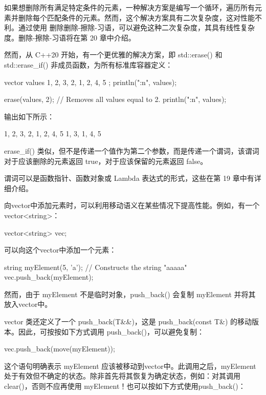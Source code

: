如果想删除所有满足特定条件的元素，一种解决方案是编写一个循环，遍历所有元素并删除每个匹配条件的元素。然而，这个解决方案具有二次复杂度，这对性能不利。通过使用 删除删除-擦除-习语，可以避免这种二次复杂度，其具有线性复杂度。删除-擦除-习语将在第 20 章中介绍。

然而，从 C++20 开始，有一个更优雅的解决方案，即 std::erase() 和 std::erase\_if() 非成员函数，为所有标准库容器定义：

\begin{cpp}
vector values { 1, 2, 3, 2, 1, 2, 4, 5 };
println("{:n}", values);

erase(values, 2); // Removes all values equal to 2.
println("{:n}", values);
\end{cpp}

输出如下所示：

\begin{shell}
1, 2, 3, 2, 1, 2, 4, 5
1, 3, 1, 4, 5
\end{shell}

erase\_if() 类似，但不是传递一个值作为第二个参数，而是传递一个谓词，该谓词对于应该删除的元素返回 true，对于应该保留的元素返回 false。

谓词可以是函数指针、函数对象或 Lambda 表达式的形式，这些在第 19 章中有详细介绍。


向vector中添加元素时，可以利用移动语义在某些情况下提高性能。例如，有一个vector<string>：

\begin{cpp}
vector<string> vec;
\end{cpp}

可以向这个vector中添加一个元素：

\begin{cpp}
string myElement(5, 'a'); // Constructs the string "aaaaa"
vec.push_back(myElement);
\end{cpp}

然而，由于 myElement 不是临时对象，push\_back() 会复制 myElement 并将其放入vector中。

vector 类还定义了一个 push\_back(T\&\&)，这是 push\_back(const T\&) 的移动版本。因此，可按按如下方式调用 push\_back()，可以避免复制：

\begin{cpp}
vec.push_back(move(myElement));
\end{cpp}

这个语句明确表示 myElement 应该被移动到vector中。此调用之后，myElement 处于有效但不确定的状态。除非首先将其恢复为确定状态，例如：对其调用 clear()，否则不应再使用 myElement！也可以按如下方式使用push\_back()：

